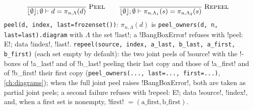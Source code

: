 \[
\frac{}{\lfloor\emptyset\rfloor;\emptyset\vdash d=\pi_{n,\Lambda}(d)}\;\textsc{Peel}
\qquad
\frac{}{\lfloor\emptyset\rfloor;\emptyset\vdash \pi_{n,\Lambda_1}(s)=\pi_{n,\Lambda_2}(s)}\;\textsc{Repeel}
\]
\texttt{peel(\allowbreak{}d,\allowbreak{} index,\allowbreak{} last=frozenset(\allowbreak{}))}: $\pi_{n,\Lambda}(d)$ is \texttt{peel\_\allowbreak{}owners(\allowbreak{}d,\allowbreak{} n,\allowbreak{} last=last).\allowbreak{}diagram} with $\Lambda$ the set \code!last!; a \py!BangBoxError! refuses with \code!peel: E!; data \code!index!, \code!last!. \texttt{repeel(\allowbreak{}source,\allowbreak{} index,\allowbreak{} a\_\allowbreak{}last,\allowbreak{} b\_\allowbreak{}last,\allowbreak{} a\_\allowbreak{}first,\allowbreak{} b\_\allowbreak{}first)} (each set empty by default): the two joint peels of \code!source! with the !-boxes of \code!a_last! and of \code!b_last! peeling their last copy and those of \code!a_first! and of \code!b_first! their first copy (\texttt{peel\_\allowbreak{}owners(\allowbreak{}.\allowbreak{}.\allowbreak{}.\allowbreak{},\allowbreak{} last=.\allowbreak{}.\allowbreak{}.\allowbreak{},\allowbreak{} first=.\allowbreak{}.\allowbreak{}.\allowbreak{})}, \cref{ch:diagrams}); when the full joint peel raises \py!BangBoxError!, both are taken as partial joint peels; a second failure refuses with \code!repeel: E!; data \code!source!, \code!index!, and, when a first set is nonempty, \code!first! $=(\text{a\_first},\text{b\_first})$.

